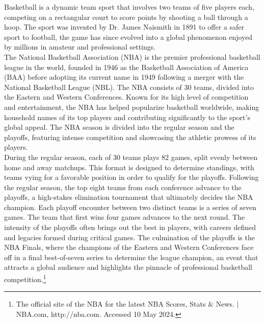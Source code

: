 \documentclass[fleqn,10pt]{SelfArx} %
\begin{document}
Basketball is a dynamic team sport that involves two teams of five players each, competing on a rectangular court to score points by shooting a ball through a hoop. The sport was invented by Dr. James Naismith in 1891 to offer a safer sport to football, the game has since evolved into a global phenomenon enjoyed by millions in amateur and professional settings.\\
The National Basketball Association (NBA) is the premier professional basketball league in the world, founded in 1946 as the Basketball Association of America (BAA) before adopting its current name in 1949 following a merger with the National Basketball League (NBL). The NBA consists of 30 teams, divided into the Eastern and Western Conferences. Known for its high level of competition and entertainment, the NBA has helped popularize basketball worldwide, making household names of its top players and contributing significantly to the sport's global appeal. The NBA season is divided into the regular season and the playoffs, featuring intense competition and showcasing the athletic prowess of its players.\\
During the regular season, each of 30 teams plays 82 games, split evenly between home and away matchups. This format is designed to determine standings, with teams vying for a favorable position in order to qualify for the playoffs. Following the regular season, the top eight teams from each conference advance to the playoffs, a high-stakes elimination tournament that ultimately decides the NBA champion.  Each playoff encounter between two distinct teams is a series of seven games. The team that first wins four games advances to the next round. The intensity of the playoffs often brings out the best in players, with careers defined and legacies formed during critical games. The culmination of the playoffs is the NBA Finals, where the champions of the Eastern and Western Conferences face off in a final best-of-seven series to determine the league champion, an event that attracts a global audience and highlights the pinnacle of professional basketball competition.\footnote{The official site of the NBA for the latest NBA Scores, Stats \& News. $|$ NBA.com, http://nba.com. Accessed 10 May 2024.}\\
\end{document}
